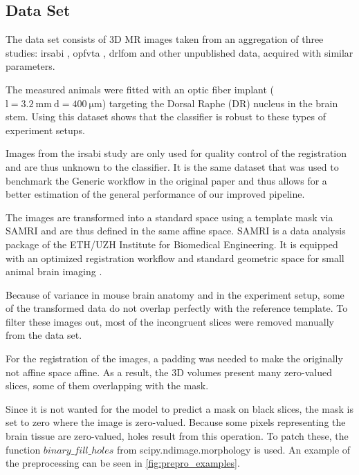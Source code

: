 \subsection{Data Set} \label{subsec:Data Set}
The data set consists of 3D MR images taken from an aggregation of three studies: irsabi \cite{irsabi_bidsdata}, opfvta \cite{ioanas_whole-brain_nodate}, drlfom \cite{ioanas_effects_nodate} and other unpublished data, acquired with similar parameters.

The measured animals were fitted with an optic fiber implant ($\mathrm{l=\SI{3.2}{\milli\meter} \ d=\SI{400}{\micro\meter}}$) targeting the Dorsal Raphe (DR) nucleus in the brain stem.
Using this dataset shows that the classifier is robust to these types of experiment setups.

Images from the irsabi study are only used for quality control of the registration and are thus unknown to the classifier.
It is the same dataset that was used to benchmark the Generic workflow in the original paper and thus allows for a better estimation of the general performance of our improved pipeline.

The images are transformed into a standard space using a template mask via SAMRI \cite{noauthor_ibt-fmi/samri_2019} and are thus defined in the same affine space.
SAMRI is a data analysis package of the ETH/UZH Institute for Biomedical Engineering.
It is equipped with an optimized registration workflow and standard geometric space for small animal brain imaging \cite{ioanas_optimized_2019}.

Because of variance in mouse brain anatomy and in the experiment setup, some of the transformed data do not overlap perfectly with the reference template.
To filter these images out, most of the incongruent slices were removed manually from the data set.

For the registration of the images, a padding was needed to make the originally not affine space affine.
As a result, the 3D volumes present many zero-valued slices, some of them overlapping with the mask.

Since it is not wanted for the model to predict a mask on black slices, the mask is set to zero where the image is zero-valued.
Because some pixels representing the brain tissue are zero-valued, holes result from this operation.
To patch these, the function \textcolor{mg}{\texttt{$binary\_fill\_holes$}} from scipy.ndimage.morphology \cite{noauthor_multi-dimensional_nodate} is used.
An example of the preprocessing can be seen in \cref{fig:prepro_examples}.

